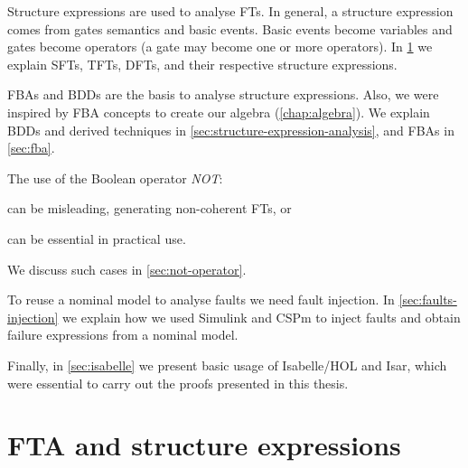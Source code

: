 \documentclass[12pt,openright,twoside,a4paper,oldfontcommands,english,brazil,final]{abntex2}
\theoremstyle{theo}
\newcommand{\simulink}{Simulink\xspace}
\begin{document}
Structure expressions are used to analyse \aclp{FT}.
In general, a structure expression comes from gates semantics and basic events.
Basic events become variables and gates become operators (a gate may become one or more operators).
In \cref{sec:fault-trees} we explain \acp{SFT}, \acp{TFT}, \acp{DFT}, and their respective structure expressions.

\Acp{FBA} and \acp{BDD} are the basis to analyse structure expressions.
Also, we were inspired by \ac{FBA} concepts to create our \acl{algebra} (\cref{chap:algebra}).
We explain \acp{BDD} and derived techniques in \cref{sec:structure-expression-analysis}, and \acp{FBA} in \cref{sec:fba}.

The use of the Boolean operator \emph{NOT}:
\begin{alineasinline}
  \item can be misleading, generating non-coherent \aclp{FT}, or
  \item can be essential in practical use.
\end{alineasinline}
We discuss such cases in \cref{sec:not-operator}.

To reuse a nominal model to analyse faults we need fault injection.
In \cref{sec:faults-injection} we explain how we used \simulink and \ac{CSPm} to inject faults and obtain failure expressions from a nominal model.

Finally, in \cref{sec:isabelle} we present basic usage of Isabelle/HOL and \ac{Isar}, which were essential to carry out the proofs presented in this thesis.

\section{\Acl*{FTA} and structure expressions}
\label{sec:fault-trees}
\end{document}
